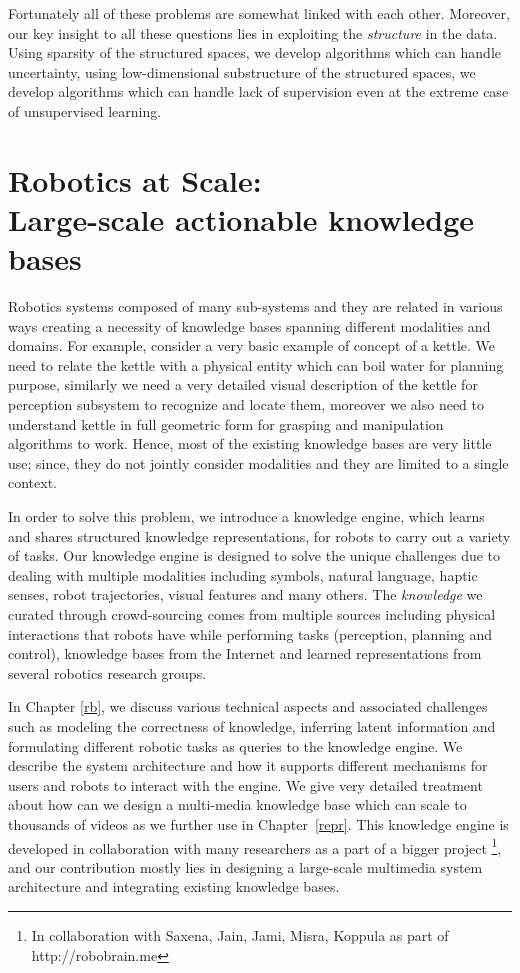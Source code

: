 Fortunately all of these problems are somewhat linked with each other. Moreover, our key insight to all these questions lies in exploiting the \emph{structure} in the data. Using sparsity of the structured spaces, we develop algorithms which can handle uncertainty, using low-dimensional substructure of the structured spaces, we develop algorithms which can handle lack of supervision even at the extreme case of unsupervised learning. 


\section{Robotics at Scale: \\ Large-scale actionable knowledge bases}
Robotics systems composed of many sub-systems and they are related in various ways creating a necessity of knowledge bases spanning different modalities and domains. For example, consider a very basic example of concept of a kettle. We need to relate the kettle with a physical entity which can boil water for planning purpose, similarly we need a very detailed visual description of the kettle for perception subsystem to recognize and locate them, moreover we also need to understand kettle in full geometric form for grasping and manipulation algorithms to work. Hence, most of the existing knowledge bases\cite{yago2007, ferrucci2012a, freebase2008} are very little use; since, they do not jointly consider modalities and they are limited to a single context.

In order to solve this problem, we introduce a knowledge engine, which learns and shares structured knowledge representations, for robots to carry out a variety of tasks. Our knowledge engine is designed to solve the unique challenges due to dealing with multiple modalities including symbols, natural language, haptic senses, robot trajectories, visual features and many others. The \textit{knowledge} we curated through crowd-sourcing comes from multiple sources including physical interactions that robots have while performing tasks (perception, planning and control), knowledge bases from the Internet and learned representations from several robotics research groups. 

In Chapter \ref{rb}, we discuss various technical aspects and associated challenges such as modeling the correctness of knowledge, inferring latent information and formulating different robotic tasks as  queries to the knowledge engine. We describe the system architecture and how it supports different mechanisms for users and robots to interact with the engine. We give very detailed treatment about how can we design a multi-media knowledge base which can scale to thousands of videos as we further use in Chapter~\ref{repr}. This knowledge engine is developed in collaboration with many researchers as a part of a bigger project  \footnote{In collaboration with Saxena, Jain, Jami, Misra, Koppula as part of http://robobrain.me}, and our contribution mostly lies in designing a large-scale multimedia system architecture and  integrating existing knowledge bases. 


